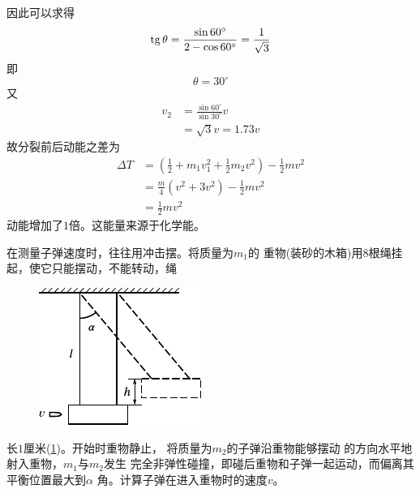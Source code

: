 因此可以求得
\begin{equation*}
  \operatorname{tg} \theta = \frac { \sin 60 ^ { \circ } } { 2 - \cos 60 ^ { \circ } } = \frac { 1 } { \sqrt { 3 } }
\end{equation*}
即\vspace{-1.56em}
\begin{equation*}
  \theta = 30 ^ { \circ }
\end{equation*}
又\vspace{-1.56em}
\begin{equation*}
  \begin{split}
    v _ { 2 } &= \frac { \sin 60 ^ { \circ } } { \sin 3 0 ^ { \circ } } v \\
    &= \sqrt { 3 } v = 1.73 v
  \end{split}
\end{equation*}
故分裂前后动能之差为
\begin{equation*}
  \begin{split}
    \Delta T &= \left( \frac { 1 } { 2 } + m _ { 1 } v _ { 1 } ^ { 2 } + \frac { 1 } { 2 } m _ { 2 } v ^ { 2 } \right) - \frac { 1 } { 2 } m v ^ { 2 }  \\
    &= \frac { m } { 4 } \left( v ^ { 2 } + 3 v ^ { 2 } \right) - \frac { 1 } { 2 } m v ^ { 2 }  \\
    &= \frac { 1 } { 2 } m v ^ { 2 }
  \end{split}
\end{equation*}
动能增加了$ 1 $倍。这能量来源于化学能。

\example 在测量子弹速度时，往往用冲击摆。将质量为$ m _ 1 $的
重物(装砂的木箱)用$ 8 $根绳挂起，使它只能摆动，不能转动，绳
\begin{figure}
  \centering
  \includegraphics{figure/fig08.03}
  \caption{}
  \label{fig:08.03}
\end{figure}
长$ 1 $厘米(\ref{fig:08.03})。开始时重物静止，
将质量为$ m _ 2 $的子弹沿重物能够摆动
的方向水平地射入重物，$ m _ 1 $与$ m _ 2 $发生
完全非弹性碰撞，即碰后重物和子弹一起运动，而偏离其平衡位置最大到$ \alpha $
角。计算子弹在进入重物时的速度$ v $。

